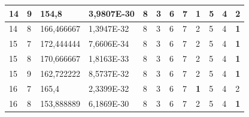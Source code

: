 \documentclass[conference]{IEEEtran}
\begin{document}
\begin{table}[]
\begin{tabular}{|llll|llllllll|}
		\multicolumn{1}{|l|}{14}  & \multicolumn{1}{l|}{9}         & \multicolumn{1}{l|}{154,8}         & 3,9807E-30 & \multicolumn{1}{l|}{8}   & \multicolumn{1}{l|}{3}   & \multicolumn{1}{l|}{6}   & \multicolumn{1}{l|}{7}   & \multicolumn{1}{l|}{\textbf{1}} & \multicolumn{1}{l|}{5}   & \multicolumn{1}{l|}{4}   & 2                      \\ \hline
		\multicolumn{1}{|l|}{14}  & \multicolumn{1}{l|}{8}         & \multicolumn{1}{l|}{166,466667}    & 1,3947E-32 & \multicolumn{1}{l|}{8}   & \multicolumn{1}{l|}{3}   & \multicolumn{1}{l|}{6}   & \multicolumn{1}{l|}{7}   & \multicolumn{1}{l|}{2}          & \multicolumn{1}{l|}{5}   & \multicolumn{1}{l|}{4}   & \textbf{1}             \\ \hline
		\multicolumn{1}{|l|}{15}  & \multicolumn{1}{l|}{7}         & \multicolumn{1}{l|}{172,444444}    & 7,6606E-34 & \multicolumn{1}{l|}{8}   & \multicolumn{1}{l|}{3}   & \multicolumn{1}{l|}{6}   & \multicolumn{1}{l|}{7}   & \multicolumn{1}{l|}{2}          & \multicolumn{1}{l|}{5}   & \multicolumn{1}{l|}{4}   & \textbf{1}             \\ \hline
		\multicolumn{1}{|l|}{15}  & \multicolumn{1}{l|}{8}         & \multicolumn{1}{l|}{170,666667}    & 1,8163E-33 & \multicolumn{1}{l|}{8}   & \multicolumn{1}{l|}{3}   & \multicolumn{1}{l|}{6}   & \multicolumn{1}{l|}{7}   & \multicolumn{1}{l|}{2}          & \multicolumn{1}{l|}{5}   & \multicolumn{1}{l|}{4}   & \textbf{1}             \\ \hline
		\multicolumn{1}{|l|}{15}  & \multicolumn{1}{l|}{9}         & \multicolumn{1}{l|}{162,722222}    & 8,5737E-32 & \multicolumn{1}{l|}{8}   & \multicolumn{1}{l|}{3}   & \multicolumn{1}{l|}{6}   & \multicolumn{1}{l|}{7}   & \multicolumn{1}{l|}{2}          & \multicolumn{1}{l|}{5}   & \multicolumn{1}{l|}{4}   & \textbf{1}             \\ \hline
		\multicolumn{1}{|l|}{16}  & \multicolumn{1}{l|}{7}         & \multicolumn{1}{l|}{165,4}         & 2,3399E-32 & \multicolumn{1}{l|}{8}   & \multicolumn{1}{l|}{3}   & \multicolumn{1}{l|}{6}   & \multicolumn{1}{l|}{7}   & \multicolumn{1}{l|}{\textbf{1}} & \multicolumn{1}{l|}{5}   & \multicolumn{1}{l|}{4}   & 2                      \\ \hline
		\multicolumn{1}{|l|}{16}  & \multicolumn{1}{l|}{8}         & \multicolumn{1}{l|}{153,888889}    & 6,1869E-30 & \multicolumn{1}{l|}{8}   & \multicolumn{1}{l|}{3}   & \multicolumn{1}{l|}{6}   & \multicolumn{1}{l|}{7}   & \multicolumn{1}{l|}{2}          & \multicolumn{1}{l|}{5}   & \multicolumn{1}{l|}{4}   & \textbf{1}             \\ \hline

\end{tabular}
\end{table}
\end{document}
